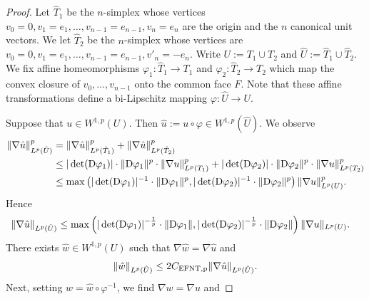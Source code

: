 \documentclass[a4paper]{article}
\begin{document}
\begin{proof}
    Let $\hat T_1$ be the $n$-simplex whose vertices $v_0=0, v_1=e_1, \dots, v_{n-1} = e_{n-1}, v_n = e_n$ are the origin and the $n$ canonical unit vectors. 
    We let $\hat T_2$ be the $n$-simplex whose vertices are $v_0=0, v_1=e_1, \dots, v_{n-1} = e_{n-1}, v'_n = -e_n$. 
    Write $U := T_1 \cup T_2$ and $\hat U := \hat T_1 \cup \hat T_2$.
    We fix affine homeomorphisms $\varphi_1 : \hat T_1 \rightarrow T_1$ and $\varphi_2 : \hat T_2 \rightarrow T_2$
    which map the convex closure of $v_0, \dots, v_{n-1}$ onto the common face $F$.
    Note that these affine transformations define a bi-Lipschitz mapping $\varphi : \hat U \rightarrow U$. 
    
    Suppose that $u \in W^{1,p}(U)$. Then $\hat u := u \circ \varphi \in W^{1,p}(\hat U)$. 
    We observe 
    \begin{align*}
        \| \nabla \hat u \|_{L^{p}(\hat U)}^{p}
        &=
        \| \nabla \hat u \|_{L^{p}(\hat T_1)}^{p}
        +
        \| \nabla \hat u \|_{L^{p}(\hat T_2)}^{p}
        \\&
        \leq 
        |\det({\mathrm D} \varphi_1)|
        \cdot \| {\mathrm D} \varphi_1 \|^{p}
        \cdot 
        \| \nabla u \|_{L^{p}(T_1)}^{p}
        +
        |\det({\mathrm D} \varphi_2)|
        \cdot \| {\mathrm D} \varphi_2 \|^{p}
        \cdot 
        \| \nabla u \|_{L^{p}(T_2)}^{p}
        \\&
        \leq 
        \max\left( 
            |\det({\mathrm D} \varphi_1)|^{-1} \cdot \| {\mathrm D} \varphi_1 \|^{p}
            ,
            |\det({\mathrm D} \varphi_2)|^{-1} \cdot \| {\mathrm D} \varphi_2 \|^{p}
        \right)
        \| \nabla u \|_{L^{p}(U)}^{p}
        .
    \end{align*}
    Hence 
    \begin{align*}
        \| \nabla \hat u \|_{L^{p}(\hat U)}
        &\leq 
        \max\left( 
            |\det({\mathrm D} \varphi_1)|^{-\frac 1 p} \cdot \| {\mathrm D} \varphi_1 \|
            ,
            |\det({\mathrm D} \varphi_2)|^{-\frac 1 p} \cdot \| {\mathrm D} \varphi_2 \|
        \right)
        \| \nabla u \|_{L^{p}(U)}
        .
    \end{align*}
    There exists $\hat w \in W^{1,p}(U)$ such that $\nabla \hat w = \nabla \hat u$ and 
    \begin{align*}
        \| \hat w \|_{L^{p}(\hat U)}
        \leq 
        2 C_{\rm{EFNT},p}
        \| \nabla \hat u \|_{L^{p}(\hat U)}
        .
    \end{align*}
    Next, setting $w = \hat w \circ \varphi^{-1}$, we find $\nabla w = \nabla u$ and 

\end{proof}
\end{document}
